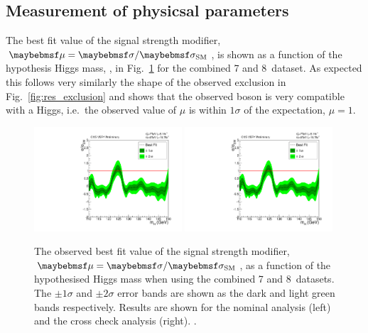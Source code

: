 \subsection{Measurement of physicsal parameters}

The best fit value of the signal strength modifier, $\mu=\musm$, is shown as a function of the hypothesis Higgs mass, \mH, in Fig.~\ref{fig:res_mumh} for the combined 7 and 8~\TeV dataset. As expected this follows very similarly the shape of the observed exclusion in Fig.~\ref{fig:res_exclusion} and shows that the observed boson is very compatible with a \SM Higgs, i.e.~the observed value of $\mu$ is within $1\sigma$ of the \SM expectation, $\mu=1$. 

\begin{figure}
  \includegraphics[width=0.49\textwidth]{ch5_anal_and_results/plots/results/obsmumh.pdf}
  \includegraphics[width=0.49\textwidth]{ch5_anal_and_results/plots/results/obsmumh_sideband.pdf}
  \caption{The observed best fit value of the signal strength modifier, $\mu=\musm$, as a function of the hypothesised Higgs mass \mH when using the combined 7 and 8~\TeV datasets. The $\pm1\sigma$ and $\pm2\sigma$ error bands are shown as the dark and light green bands respectively. Results are shown for the nominal \MFM analysis (left) and the cross check \SMVA analysis (right). \plotupdate.}
  \label{fig:res_mumh}
\end{figure}

